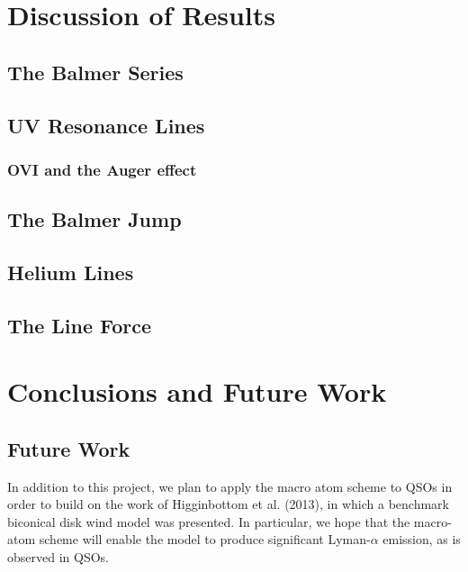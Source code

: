 \documentclass[useAMS,usenatbib, onecolumn]{mn2ejm}
\begin{document}
\section{Discussion of Results}

\subsection{The Balmer Series}

\subsection{UV Resonance Lines}
\subsubsection{OVI and the Auger effect}

\subsection{The Balmer Jump}
\label{balmerjump}

\subsection{Helium Lines}

\subsection{The Line Force}




%
%


\section{Conclusions and Future Work}



\subsection{Future Work}

In addition to this project, we plan to apply the macro atom scheme to QSOs in order to build on the work of Higginbottom et al. (2013),
in which a benchmark biconical disk wind model was presented. In particular, we hope that the macro-atom scheme will enable the
model to produce significant Lyman-$\alpha$ emission, as is observed in QSOs.
\end{document}
